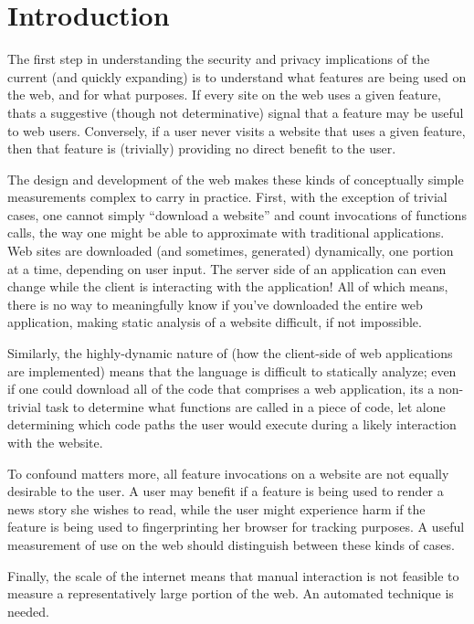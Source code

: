 \section{Introduction}
\label{measurement:overview}

The first step in understanding the security and privacy implications
of the current (and quickly expanding) \WAPI is to understand what features
are being used on the web, and for what purposes.  If every site on the
web uses a given \WAPI feature, thats a suggestive (though not determinative)
signal that a feature may be useful to web users.  Conversely, if a user
never visits a website that uses a given \WAPI feature, then that feature
is (trivially) providing no direct benefit to the user.

The design and development of the web makes these kinds of conceptually simple
measurements complex to carry in practice.  First, with the exception of
trivial cases, one cannot simply ``download a website'' and count invocations
of functions calls, the way one might be able to approximate with traditional
applications.  Web sites are downloaded (and sometimes, generated) dynamically,
one portion at a time, depending on user input. The server side of an
application can even change while the client is interacting with the
application!  All of which means, there is no way to meaningfully know if
you've downloaded the entire web application, making static analysis of a
website difficult, if not impossible.

Similarly, the highly-dynamic nature of \JS (how the client-side of web
applications are implemented) means that the language is difficult to
statically analyze; even if one could download all of the \JS code that
comprises a web application, its a non-trivial task to determine what \WAPI
functions are called in a piece of code, let alone determining which code paths
the user would execute during a likely interaction with the website.

To confound matters more, all feature invocations on a website are not equally
desirable to the user.  A user may benefit if a feature is being used to render
a news story she wishes to read, while the user might experience harm if the
feature is being used to fingerprinting her browser for tracking purposes.  A
useful measurement of \WAPI use on the web should distinguish between these
kinds of cases.

Finally, the scale of the internet means that manual interaction is not
feasible to measure a representatively large portion of the web.  An automated
technique is needed.

